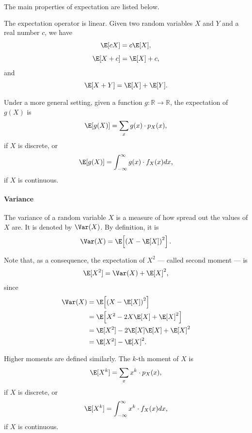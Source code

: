 The main properties of expectation are listed below.

The expectation operator is linear.  Given two random variables $X$ and $Y$ and a real
number $c$, we have
\begin{equation*}
  \E[c X] = c \E[X]\text{,}
\end{equation*}
\begin{equation*}
  \E[X + c] = \E[X] + c\text{,}
\end{equation*}
and
\begin{equation*}
  \E[X + Y] = \E[X] + \E[Y]\text{.}
\end{equation*}

Under a more general setting, given a function $g : \mathbb{R} \rightarrow \mathbb{R}$,
the expectation of $g(X)$ is
\begin{equation*}
  \E[g(X)] = \sum_{x} g(x) \cdot p_X(x)\text{,}
\end{equation*}
if $X$ is discrete, or
\begin{equation*}
  \E[g(X)] = \int_{-\infty}^{\infty} g(x) \cdot f_X(x) dx\text{,}
\end{equation*}
if $X$ is continuous.

\paragraph{Variance}  The variance of a random variable $X$ is a measure of how
spread out the values of $X$ are.  It is denoted by $\Var(X)$.  By definition, it is
\begin{equation}
  \label{eq:variance}
  \Var(X) = \E\!\left[\left(X - \E[X]\right)^2\right]\text{.}
\end{equation}

Note that, as a consequence, the expectation of $X^2$ --- called second moment --- is
\[
  \E[X^2] = \Var(X) + \E[X]^2\text{,}
\]
since
\begin{align*}
  \Var(X)
    &= \E\!\left[\left(X - \E[X]\right)^2\right] \\
    &= \E\!\left[X^2 - 2 X \E[X] + \E[X]^2\right] \\
    &= \E[X^2] - 2 \E[X] \E[X] + \E[X]^2 \\
    &= \E[X^2] - \E[X]^2\text{.}
\end{align*}

Higher moments are defined similarly.  The $k$-th moment of $X$ is
\begin{equation*}
  \E[X^k] = \sum_{x} x^k \cdot p_X(x)\text{,}
\end{equation*}
if $X$ is discrete, or
\begin{equation*}
  \E[X^k] = \int_{-\infty}^{\infty} x^k \cdot f_X(x) dx\text{,}
\end{equation*}
if $X$ is continuous.

